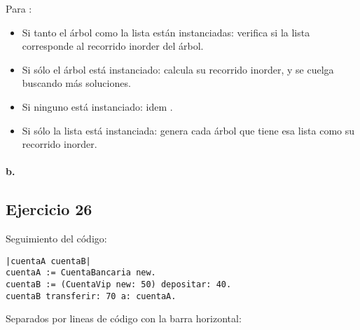Para :

\begin{itemize}
  \item Si tanto el árbol como la lista están instanciadas: verifica si la lista corresponde al recorrido inorder del árbol.
  \item Si sólo el árbol está instanciado: calcula su recorrido inorder, y se cuelga buscando más soluciones.
  \item Si ninguno está instanciado: idem .
  \item Si sólo la lista está instanciada: genera cada árbol que tiene esa lista como su recorrido inorder.
\end{itemize}

\paragraph{b.}


\subsection*{Ejercicio 26}

Seguimiento del código:

\begin{verbatim}
|cuentaA cuentaB|
cuentaA := CuentaBancaria new.
cuentaB := (CuentaVip new: 50) depositar: 40.
cuentaB transferir: 70 a: cuentaA.
\end{verbatim}

Separados por lineas de código con la barra horizontal:

